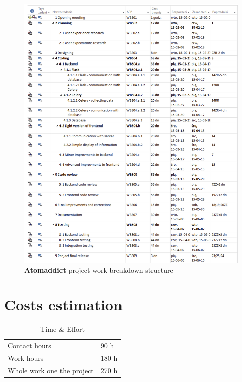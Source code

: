 \documentclass[12pt]{article}
\begin{document}
\begin{figure}[H]
    \centering
    \includegraphics[width=\textwidth]{images/breakdown.png}
    \caption{\textbf{Atomaddict} project work breakdown structure}
\end{figure}


\section{Costs estimation}

\begin{table}[H]
\centering
    \begin{tabular}{p{5cm}p{9cm}}  \hline
    \rowcolor{blue!20!black!30!yellow}\multicolumn{2}{|c|}{\textbf{Time \& Effort}} \\ \hline \hline

    Contact hours               & 90 h   \\ \hline
    Work hours                  & 180 h  \\ \hline
    Whole work one the project  & 270 h \\ \hline

    \end{tabular}
    \caption{Time \& Effort}
\end{table}
\end{document}

